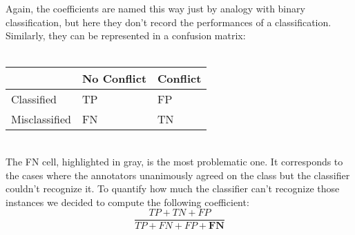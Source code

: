 Again, the coefficients are named this way just by analogy with binary classification, but here they don't record the performances of a classification. Similarly, they can be represented in a confusion matrix:
\\
\\
\begin{table}[H]
\centering
\begin{tabular}{|l|l|l|}
\hline
              & No Conflict                & Conflict \\ \hline
Classified    & TP                         & FP       \\ \hline
Misclassified & \cellcolor[HTML]{9B9B9B}FN & TN       \\ \hline
\end{tabular}
\end{table}
\\

The FN cell, highlighted in gray, is the most problematic one. It corresponds to the cases where the annotators unanimously agreed on the class but the classifier couldn't recognize it. To quantify how much the classifier can't recognize those instances we decided to compute the following coefficient:
\begin{equation*}
\frac{TP + TN + FP}{TP + FN + FP + \textbf{FN}}
\end{equation*}


